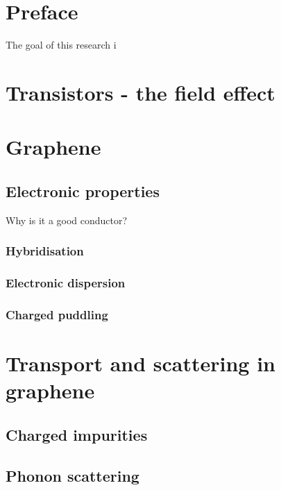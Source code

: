 \documentclass[../Matt_Gebert_Honours_Thesis.tex]{subfiles}
\begin{document}
	

	\section{Preface}
	The goal of this research i
	
	
	\section{Transistors - the field effect}
	
	\section{Graphene}
	\subsection{Electronic properties}
	Why is it a good conductor?
	\subsubsection{Hybridisation}
	\subsubsection{Electronic dispersion}
	\subsubsection{Charged puddling}
	
	\section{Transport and scattering in graphene}
	\subsection{Charged impurities}
	\subsection{Phonon scattering}
\end{document}
